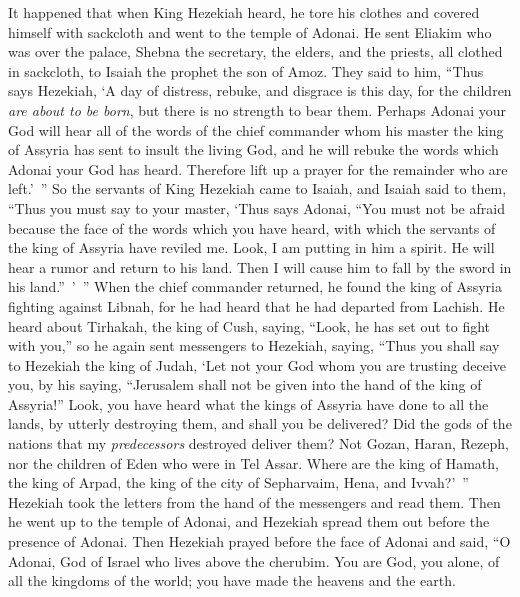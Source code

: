 \begin{biblechapter} %
 It happened that when King Hezekiah heard, he tore his clothes and covered himself with sackcloth and went to the temple of Adonai.
\verse He sent Eliakim who was over the palace, Shebna the secretary, the elders, and the priests, all clothed in sackcloth, to Isaiah the prophet the son of Amoz.
\verse They said to him, “Thus says Hezekiah, ‘A day of distress, rebuke, and disgrace is this day, for the children \textit{are about to be born}, but there is no strength to bear them.
\verse Perhaps Adonai your God will hear all of the words of the chief commander whom his master the king of Assyria has sent to insult the living God, and he will rebuke the words which Adonai your God has heard. Therefore lift up a prayer for the remainder who are left.’ ”
\verse So the servants of King Hezekiah came to Isaiah,
\verse and Isaiah said to them, “Thus you must say to your master, ‘Thus says Adonai, “You must not be afraid because the face of the words which you have heard, with which the servants of the king of Assyria have reviled me.
\verse Look, I am putting in him a spirit. He will hear a rumor and return to his land. Then I will cause him to fall by the sword in his land.” ’ ”
 When the chief commander returned, he found the king of Assyria fighting against Libnah, for he had heard that he had departed from Lachish.
\verse He heard about Tirhakah, the king of Cush, saying, “Look, he has set out to fight with you,” so he again sent messengers to Hezekiah, saying,
\verse “Thus you shall say to Hezekiah the king of Judah, ‘Let not your God whom you are trusting deceive you, by his saying, “Jerusalem shall not be given into the hand of the king of Assyria!”
\verse Look, you have heard what the kings of Assyria have done to all the lands, by utterly destroying them, and shall you be delivered?
\verse Did the gods of the nations that my \textit{predecessors} destroyed deliver them? Not Gozan, Haran, Rezeph, nor the children of Eden who were in Tel Assar.
\verse Where are the king of Hamath, the king of Arpad, the king of the city of Sepharvaim, Hena, and Ivvah?’ ”
 Hezekiah took the letters from the hand of the messengers and read them. Then he went up to the temple of Adonai, and Hezekiah spread them out before the presence of Adonai.
\verse Then Hezekiah prayed before the face of Adonai and said, “O Adonai, God of Israel who lives above the cherubim. You are God, you alone, of all the kingdoms of the world; you have made the heavens and the earth.

\end{biblechapter}
